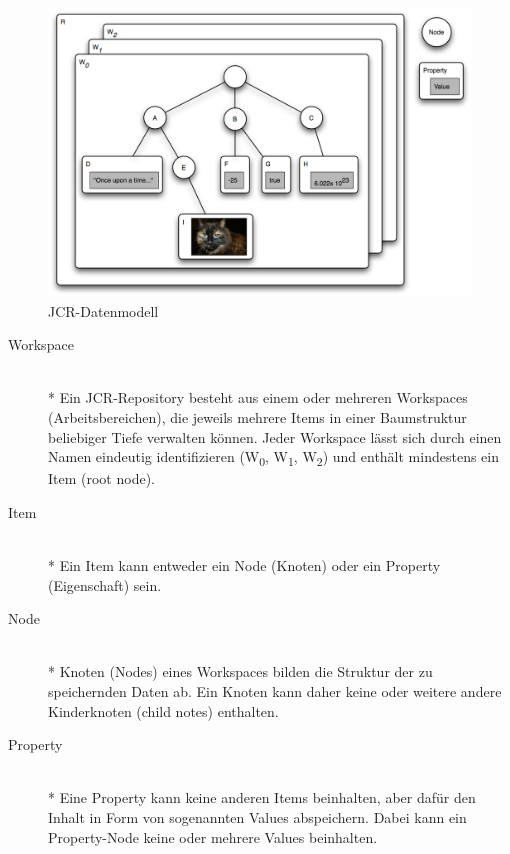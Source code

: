 \begin{figure}[!h]
\begin{center}
\includegraphics[scale=0.3]{images/repository/repository_diagramm.png}
\caption{JCR-Datenmodell}
\label{jcrdatenmodell}
\end{center}
\end{figure}



\begin{description}
\item[Workspace]\mbox{~}\\*
Ein JCR-Repository besteht aus einem oder mehreren Workspaces (Arbeitsbereichen), die jeweils mehrere Items in einer Baumstruktur beliebiger Tiefe verwalten können. Jeder Workspace lässt sich durch einen Namen eindeutig identifizieren (W\textsubscript{0}, W\textsubscript{1}, W\textsubscript{2}) und enthält mindestens ein Item (root node).
\item[Item]\mbox{~}\\*
Ein Item kann entweder ein Node (Knoten) oder ein Property (Eigenschaft) sein.
\item[Node]\mbox{~}\\*
Knoten (Nodes) eines Workspaces bilden die Struktur der zu speichernden Daten ab.
Ein Knoten kann daher keine oder weitere andere Kinderknoten (child notes) enthalten.
\item[Property]\mbox{~}\\*
Eine Property kann keine anderen Items beinhalten, aber dafür den Inhalt in Form von sogenannten Values abspeichern. Dabei kann ein Property-Node keine oder mehrere Values beinhalten.
\end{description}




